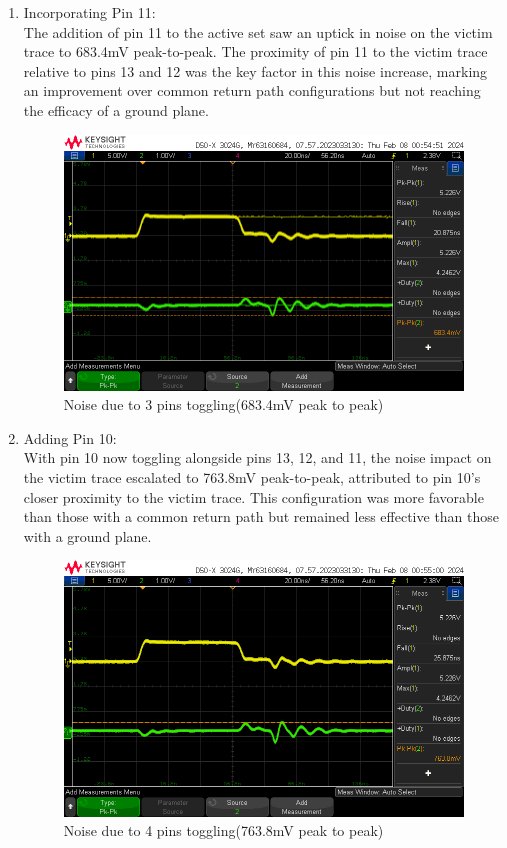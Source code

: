 \documentclass[a4paper,11pt]{article}%
\begin{document}
\begin{enumerate}
	\item Incorporating Pin 11:\\ The addition of pin 11 to the active set saw an uptick in noise on the victim trace to 683.4mV peak-to-peak. The proximity of pin 11 to the victim trace relative to pins 13 and 12 was the key factor in this noise increase, marking an improvement over common return path configurations but not reaching the efficacy of a ground plane.
	\begin{figure}[H]
		\centering
		\includegraphics[scale=0.5]{figures/noise_np__sr3.png}
		\caption{Noise due to 3 pins toggling(683.4mV peak to peak)}
		\label{noise_np__sr3}
	\end{figure}
	
	\item Adding Pin 10:\\ With pin 10 now toggling alongside pins 13, 12, and 11, the noise impact on the victim trace escalated to 763.8mV peak-to-peak, attributed to pin 10's closer proximity to the victim trace. This configuration was more favorable than those with a common return path but remained less effective than those with a ground plane.
	\begin{figure}[H]
		\centering
		\includegraphics[scale=0.5]{figures/noise_np__sr4.png}
		\caption{Noise due to 4 pins toggling(763.8mV peak to peak)}
		\label{noise_np__sr4}
	\end{figure}
	

\end{enumerate}
\end{document}
